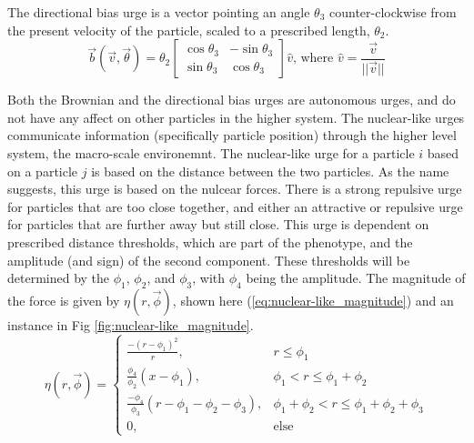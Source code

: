 \documentclass{article}
\begin{document}
The directional bias urge is a vector pointing an angle $\theta_3$ counter-clockwise from the present velocity of the particle, scaled to a prescribed length, $\theta_2$.
\begin{equation}
    \vec{b}(\vec{v}, \vec{\theta}) = \theta_2 
    \begin{bmatrix}
        \cos\theta_3 & -\sin\theta_3\\
        \sin\theta_3 & \cos\theta_3
    \end{bmatrix} \hat{v}
    \text{, where }
    \hat{v}= \frac{\vec{v}}{||\vec{v}||}
\end{equation}

Both the Brownian and the directional bias urges are autonomous urges, and do not have any affect on other particles in the higher system. The nuclear-like urges communicate information (specifically particle position) through the higher level system, the macro-scale environemnt. The nuclear-like urge for a particle $i$ based on a particle $j$ is based on the distance between the two particles. As the name suggests, this urge is based on the nulcear forces. There is a strong repulsive urge for particles that are too close together, and either an attractive or repulsive urge for particles that are further away but still close. This urge is dependent on prescribed distance thresholds, which are part of the phenotype, and the amplitude (and sign) of the second component. These thresholds will be determined by the $\phi_1$, $\phi_2$, and $\phi_3$, with $\phi_4$ being the amplitude. The magnitude of the force is given by $\eta(r, \vec{\phi})$, shown here (\ref{eq:nuclear-like_magnitude}) and an instance in Fig \ref{fig:nuclear-like_magnitude}.
\begin{equation}
    \label{eq:nuclear-like_magnitude}
    \eta(r, \vec{\phi}) = \begin{cases}
    \frac{-(r-\phi_1)^2}{r}             ,& r\leq\phi_1\\
    \frac{\phi_4}{\phi_2}(x-\phi_1) ,& \phi_1 < r \leq \phi_1 + \phi_2\\
    \frac{-\phi_4}{\phi_3}(r -\phi_1 -\phi_2 - \phi_3) ,& \phi_1 + \phi_2 < r \leq \phi_1 + \phi_2 + \phi_3\\
    0 ,& \text{else}
    \end{cases}
\end{equation}


\end{document}
